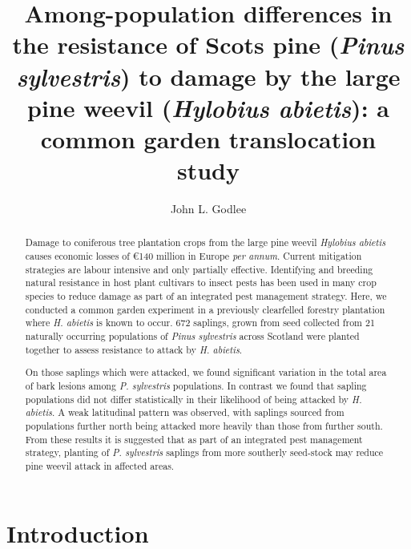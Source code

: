 \documentclass[a4paper, 11pt]{article}
\title{Among-population differences in the resistance of Scots pine (\textit{Pinus sylvestris}) to damage by the large pine weevil (\textit{Hylobius abietis}): a common garden translocation study}
\author{John L. Godlee}
\begin{document}

\maketitle{}

\begin{abstract}

	Damage to coniferous tree plantation crops from the large pine weevil \textit{Hylobius abietis} causes economic losses of \euro{}140 million in Europe \textit{per annum}. Current mitigation strategies are labour intensive and only partially effective. Identifying and breeding natural resistance in host plant cultivars to insect pests has been used in many crop species to reduce damage as part of an integrated pest management strategy. Here, we conducted a common garden experiment in a previously clearfelled forestry plantation where \textit{H. abietis} is known to occur. 672 saplings, grown from seed collected from 21 naturally occurring populations of \textit{Pinus sylvestris} across Scotland were planted together to assess resistance to attack by \textit{H. abietis}.

	On those saplings which were attacked, we found significant variation in the total area of bark lesions among \textit{P. sylvestris} populations. In contrast we found that sapling populations did not differ statistically in their likelihood of being attacked by \textit{H. abietis}. A weak latitudinal pattern was observed, with saplings sourced from populations further north being attacked more heavily than those from further south. From these results it is suggested that as part of an integrated pest management strategy, planting of \textit{P. sylvestris} saplings from more southerly seed-stock may reduce pine weevil attack in affected areas.



\end{abstract}

\section*{Introduction}
\end{document}

